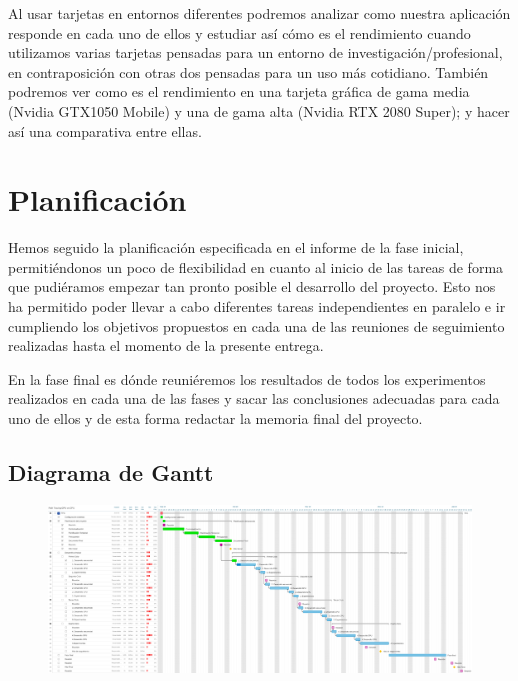 \documentclass[titlepage,12pt]{article}
\begin{document}
Al usar tarjetas en entornos diferentes podremos analizar como nuestra aplicación responde en cada uno de ellos y estudiar así cómo es el rendimiento cuando utilizamos varias tarjetas pensadas para un entorno de investigación/profesional, en contraposición con otras dos pensadas para un uso más cotidiano. También podremos ver como es el rendimiento en una tarjeta gráfica de gama media (Nvidia GTX1050 Mobile) y una de gama alta (Nvidia RTX 2080 Super); y hacer así una comparativa entre ellas.

\section{Planificación}

Hemos seguido la planificación especificada en el informe de la fase inicial, permitiéndonos un poco de flexibilidad en cuanto al inicio de las tareas de forma que pudiéramos empezar tan pronto posible el desarrollo del proyecto. Esto nos ha permitido poder llevar a cabo diferentes tareas independientes en paralelo e ir cumpliendo los objetivos propuestos en cada una de las reuniones de seguimiento realizadas hasta el momento de la presente entrega.

En la fase final es dónde reuniéremos los resultados de todos los experimentos realizados en cada una de las fases y sacar las conclusiones adecuadas para cada uno de ellos y de esta forma redactar la memoria final del proyecto.

\subsection{Diagrama de Gantt}

\uselandscape

\begin{figure}[H]
	\centering
	\includegraphics[scale=1.45]{media/final_gantt.png}
	\label{gantt}
\end{figure}
\end{document}
